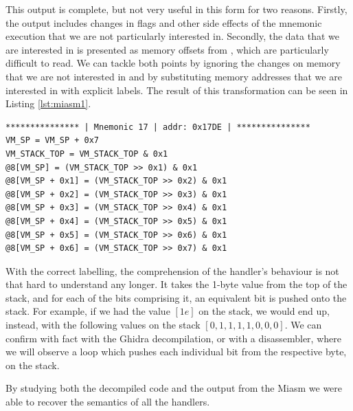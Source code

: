 
This output is complete, but not very useful in this form for two reasons. Firstly, the output includes changes in flags and other side effects of the mnemonic execution that we are not particularly interested in. Secondly, the data that we are interested in is presented as memory offsets from , which are particularly difficult to read. We can tackle both points by ignoring the changes on memory that we are not interested in and by substituting memory addresses that we are interested in with explicit labels. The result of this transformation can be seen in Listing \ref{lst:miasm1}.

\begin{lstlisting}[label={lst:miasm1}, caption={Result of symbolically executing the same function handler as in Listing \ref{lst:miasm0} with some cleanup. We only chose to display the change in relevant registers and memory locations. Additionally, we introduced labels for better clarity.}]
*************** | Mnemonic 17 | addr: 0x17DE | ***************
VM_SP = VM_SP + 0x7
VM_STACK_TOP = VM_STACK_TOP & 0x1
@8[VM_SP] = (VM_STACK_TOP >> 0x1) & 0x1
@8[VM_SP + 0x1] = (VM_STACK_TOP >> 0x2) & 0x1
@8[VM_SP + 0x2] = (VM_STACK_TOP >> 0x3) & 0x1
@8[VM_SP + 0x3] = (VM_STACK_TOP >> 0x4) & 0x1
@8[VM_SP + 0x4] = (VM_STACK_TOP >> 0x5) & 0x1
@8[VM_SP + 0x5] = (VM_STACK_TOP >> 0x6) & 0x1
@8[VM_SP + 0x6] = (VM_STACK_TOP >> 0x7) & 0x1
\end{lstlisting}

With the correct labelling, the comprehension of the handler's behaviour is not that hard to understand any longer. It takes the 1-byte value from the top of the stack, and for each of the bits comprising it, an equivalent bit is pushed onto the stack. For example, if we had the value $[1e]$ on the stack, we would end up, instead, with the following values on the stack $[0, 1, 1, 1, 1, 0, 0, 0]$. We can confirm with fact with the Ghidra decompilation, or with a disassembler, where we will observe a loop which pushes each individual bit from the respective byte, on the stack. 

By studying both the decompiled code and the output from the Miasm we were able to recover the semantics of all the handlers. 

